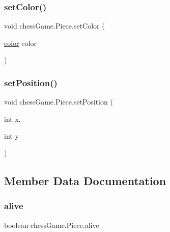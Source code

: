 \hypertarget{classchess_game_1_1_piece_a6dc59207045601b9efb024cd9ee4ccd4}{}\label{classchess_game_1_1_piece_a6dc59207045601b9efb024cd9ee4ccd4} 
\subsubsection{\texorpdfstring{set\+Color()}{setColor()}}
{\footnotesize\ttfamily void chess\+Game.\+Piece.\+set\+Color (\begin{DoxyParamCaption}\item[{\hyperlink{classchess_game_1_1_piece_ad5117cbbbaebf3a27c4f3c2bcbd6678b}{color}}]{color }\end{DoxyParamCaption})}

\hypertarget{classchess_game_1_1_piece_afb94aa7d6183aa2bb93d279dd3c5af35}{}\label{classchess_game_1_1_piece_afb94aa7d6183aa2bb93d279dd3c5af35} 
\subsubsection{\texorpdfstring{set\+Position()}{setPosition()}}
{\footnotesize\ttfamily void chess\+Game.\+Piece.\+set\+Position (\begin{DoxyParamCaption}\item[{int}]{x,  }\item[{int}]{y }\end{DoxyParamCaption})}



\subsection{Member Data Documentation}
\hypertarget{classchess_game_1_1_piece_a887a90577f888865d9ec706397415026}{}\label{classchess_game_1_1_piece_a887a90577f888865d9ec706397415026} 
\subsubsection{\texorpdfstring{alive}{alive}}
{\footnotesize\ttfamily boolean chess\+Game.\+Piece.\+alive\hspace{0.3cm}{\ttfamily [private]}}

